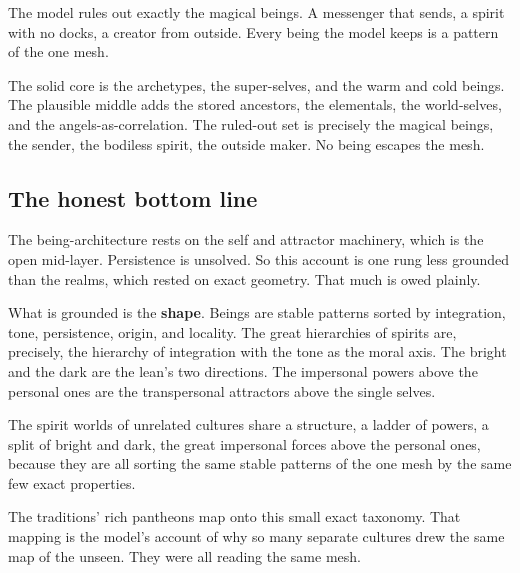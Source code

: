 The model rules out exactly the magical beings. A messenger that sends, a spirit with no docks, a creator from outside. Every being the model keeps is a pattern of the one mesh.

\begin{result}
The solid core is the archetypes, the super-selves, and the warm and cold beings. The plausible middle adds the stored ancestors, the elementals, the world-selves, and the angels-as-correlation. The ruled-out set is precisely the magical beings, the sender, the bodiless spirit, the outside maker. No being escapes the mesh.
\end{result}

\subsection{The honest bottom line}

The being-architecture rests on the self and attractor machinery, which is the open mid-layer. Persistence is unsolved. So this account is one rung less grounded than the realms, which rested on exact geometry. That much is owed plainly.

What is grounded is the \textbf{shape}. Beings are stable patterns sorted by integration, tone, persistence, origin, and locality. The great hierarchies of spirits are, precisely, the hierarchy of integration with the tone as the moral axis. The bright and the dark are the lean's two directions. The impersonal powers above the personal ones are the transpersonal attractors above the single selves.

\begin{principle}
The spirit worlds of unrelated cultures share a structure, a ladder of powers, a split of bright and dark, the great impersonal forces above the personal ones, because they are all sorting the same stable patterns of the one mesh by the same few exact properties.
\end{principle}

The traditions' rich pantheons map onto this small exact taxonomy. That mapping is the model's account of why so many separate cultures drew the same map of the unseen. They were all reading the same mesh.
